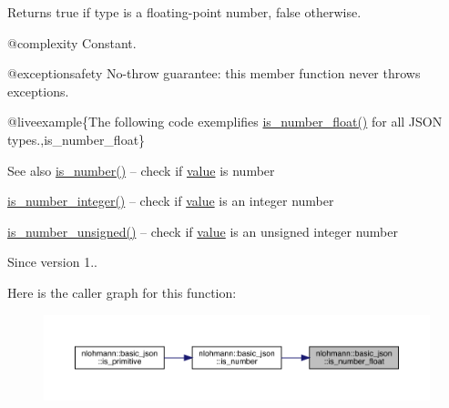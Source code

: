 \begin{DoxyReturn}{Returns}
{\ttfamily true} if type is a floating-\/point number, {\ttfamily false} otherwise.
\end{DoxyReturn}
@complexity Constant.

@exceptionsafety No-\/throw guarantee\+: this member function never throws exceptions.

@liveexample\{The following code exemplifies {\ttfamily \mbox{\hyperlink{classnlohmann_1_1basic__json_a33b4bf898b857c962e798fc7f6e86e70}{is\+\_\+number\+\_\+float()}}} for all J\+S\+ON types.,is\+\_\+number\+\_\+float\}

\begin{DoxySeeAlso}{See also}
\mbox{\hyperlink{classnlohmann_1_1basic__json_a2b9852390abb4b1ef5fac6984e2fc0f3}{is\+\_\+number()}} -- check if \mbox{\hyperlink{classnlohmann_1_1basic__json_af9c51328fbe1da75eca750be3009917a}{value}} is number 

\mbox{\hyperlink{classnlohmann_1_1basic__json_abac8af76067f1e8fdca9052882c74428}{is\+\_\+number\+\_\+integer()}} -- check if \mbox{\hyperlink{classnlohmann_1_1basic__json_af9c51328fbe1da75eca750be3009917a}{value}} is an integer number 

\mbox{\hyperlink{classnlohmann_1_1basic__json_abc7378cba0613a78b9aad1c8e7044bb0}{is\+\_\+number\+\_\+unsigned()}} -- check if \mbox{\hyperlink{classnlohmann_1_1basic__json_af9c51328fbe1da75eca750be3009917a}{value}} is an unsigned integer number
\end{DoxySeeAlso}
\begin{DoxySince}{Since}
version 1.. 
\end{DoxySince}
Here is the caller graph for this function\+:\nopagebreak
\begin{figure}[H]
\begin{center}
\leavevmode
\includegraphics[width=350pt]{classnlohmann_1_1basic__json_a33b4bf898b857c962e798fc7f6e86e70_icgraph}
\end{center}
\end{figure}
\mbox{\label{classnlohmann_1_1basic__json_abac8af76067f1e8fdca9052882c74428}} 
